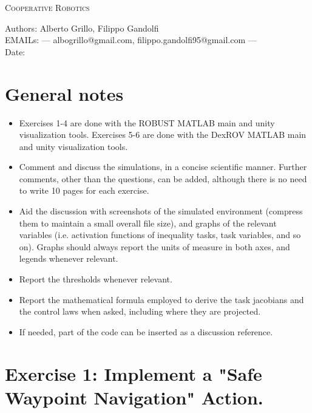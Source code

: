 \documentclass{article}
\makeatletter
\newcommand\frontmatter{%
    \cleardoublepage
  \pagenumbering{roman}}
\newcommand\mainmatter{%
    \cleardoublepage
  \pagenumbering{arabic}}
\makeatother
\begin{document}
\frontmatter
\onecolumn 
\vskip 1cm
\begin{center}
\huge \textsc{Cooperative Robotics}\\
\vskip 1cm

\skip 0.5cm

\vskip 5cm

\normalsize
Authors: Alberto Grillo, Filippo Gandolfi\\
EMAILs: --- albogrillo@gmail.com, filippo.gandolfi95@gmail.com ---\\
Date:  \\
\end{center}
\clearpage
\mainmatter
\section*{General notes}

\begin{itemize}
 \item Exercises 1-4 are done with the ROBUST MATLAB main and unity visualization tools. Exercises 5-6 are done with the DexROV MATLAB main and unity visualization tools.
 \item Comment and discuss the simulations, in a concise scientific manner. Further comments, other than the questions, can be added, although there is no need to write 10 pages for each exercise.
 \item Aid the discussion with screenshots of the simulated environment (compress them to maintain a small overall file size), and graphs of the relevant variables (i.e. activation functions of inequality tasks, task variables, and so on). Graphs should always report the units of measure in both axes, and legends whenever relevant.
 \item Report the thresholds whenever relevant.
 \item Report the mathematical formula employed to derive the task jacobians and the control laws when asked, including where they are projected.
 \item If needed, part of the code can be inserted as a discussion reference.
\end{itemize} 

\clearpage


\section{Exercise 1: Implement a "Safe Waypoint Navigation" Action.}
\end{document}
